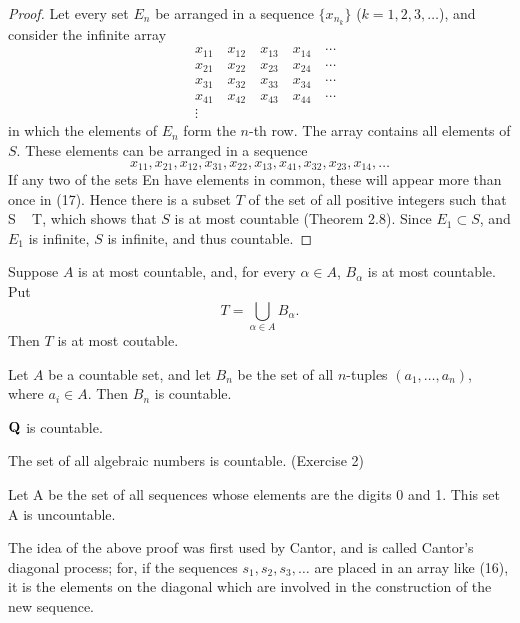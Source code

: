 \begin{proof}
Let every set $E_n$ be arranged in a sequence $\{x_{n_k}\}$ ($k=1,2,3,\dots$), and consider the infinite array
\begin{align*}
&x_{11}\quad x_{12}\quad x_{13}\quad x_{14}\quad\cdots\\
&x_{21}\quad x_{22}\quad x_{23}\quad x_{24}\quad\cdots\\
&x_{31}\quad x_{32}\quad x_{33}\quad x_{34}\quad\cdots\\
&x_{41}\quad x_{42}\quad x_{43}\quad x_{44}\quad\cdots\\
&\vdots
\end{align*}
in which the elements of $E_n$ form the $n$-th row. The array contains all elements of $S$. These elements can be arranged in a sequence
\[x_{11},x_{21},x_{12},x_{31},x_{22},x_{13},x_{41},x_{32},x_{23},x_{14},\dots\]
If any two of the sets En have elements in common, these will appear more than once in (17). Hence there is a subset $T$ of the set of all positive integers such that S ~ T, which shows that $S$ is at most countable (Theorem 2.8). Since $E_1\subset S$, and $E_1$ is infinite, $S$ is infinite, and thus countable. 
\end{proof}

\begin{corollary}
Suppose $A$ is at most countable, and, for every $\alpha\in A$, $B_\alpha$ is at most countable. Put
\[T=\bigcup_{\alpha\in A}B_\alpha.\]
Then $T$ is at most coutable.
\end{corollary}

\begin{proposition}
Let $A$ be a countable set, and let $B_n$ be the set of all $n$-tuples $(a_1,\dots,a_n)$, where $a_i\in A$. Then $B_n$ is countable.
\end{proposition}

\begin{corollary}
$\mathbf Q$ is countable.
\end{corollary}

\begin{proposition}
The set of all algebraic numbers is countable. (Exercise 2)
\end{proposition}

\begin{proposition}
Let A be the set of all sequences whose elements are the digits 0
and 1. This set A is uncountable. 
\end{proposition}

The idea of the above proof was first used by Cantor, and is called Cantor's diagonal process; for, if the sequences $s_1,s_2,s_3,\dots$ are placed in an array like (16), it is the elements on the diagonal which are involved in the construction of the new sequence.

